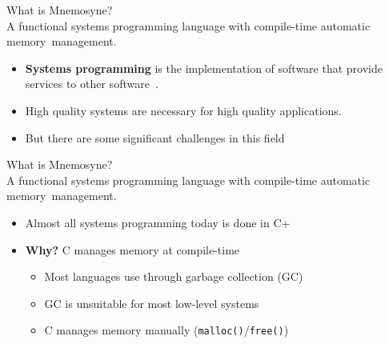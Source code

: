 \documentclass{beamer}
\begin{document}
\begin{frame}
\alert{\huge{What is Mnemosyne?}}\\
\large{A functional \alert<1->{systems programming} language with compile-time automatic memory~management.}
\normalsize
\begin{itemize}
\item<1->
    \textbf{Systems programming} is the implementation of software that provide services to other software~\cite{Narten:2003:SP:1074100.1074850,Shapiro:2006:PLC:1215995.1216004}.
    \item <3-> High quality systems are necessary for high quality applications.
\item <4-> But there are some significant challenges in this field~\cite{whyrust,Shapiro:2006:PLC:1215995.1216004}
\end{itemize}
\end{frame}

\begin{frame}
\alert{\huge{What is Mnemosyne?}}\\
\large{A functional systems programming language with \alert<1->{compile-time automatic memory~management}.}\normalsize
\begin{itemize}
\item Almost all
systems
programming today is done in C+~\cite{Shapiro:2006:PLC:1215995.1216004,hawblitzel2004low}

    \item<2-> \textbf{Why?} C manages memory at compile-time
    \begin{itemize}
        \item<3-> Most languages use through garbage collection (GC)~\cite{Bartley:2003:GC:1074100.1074419}
        \item<3-> GC is unsuitable for most low-level systems~\cite{hawblitzel2004low,Shapiro:2006:PLC:1215995.1216004,Hertz:2005:QPG:1094811.1094836}
        \item<3-> C manages memory manually (\texttt{malloc()}/\texttt{free()})~\cite{Shapiro:2006:PLC:1215995.1216004,kernighan1988c,Hertz:2005:QPG:1094811.1094836}
    \end{itemize}
\end{itemize}
\end{frame}
\end{document}
